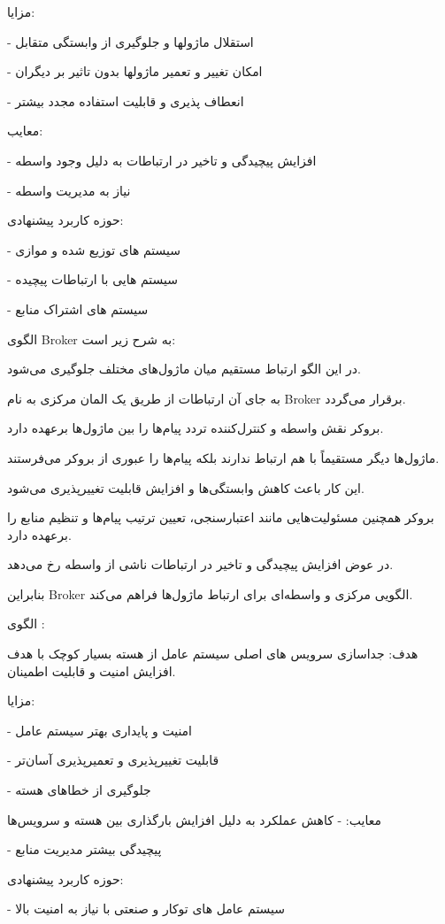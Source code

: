 مزایا:

- استقلال ماژولها و جلوگیری از وابستگی متقابل

- امکان تغییر و تعمیر ماژولها بدون تاثیر بر دیگران

- انعطاف پذیری و قابلیت استفاده مجدد بیشتر

معایب:

- افزایش پیچیدگی و تاخیر در ارتباطات به دلیل وجود واسطه

- نیاز به مدیریت واسطه

حوزه کاربرد پیشنهادی:

- سیستم های توزیع شده و موازی

- سیستم هایی با ارتباطات پیچیده

- سیستم های اشتراک منابع



الگوی Broker به شرح زیر است:

در این الگو ارتباط مستقیم میان ماژول‌های مختلف جلوگیری می‌شود.

به جای آن ارتباطات از طریق یک المان مرکزی به نام Broker برقرار می‌گردد.

بروکر نقش واسطه و کنترل‌کننده تردد پیام‌ها را بین ماژول‌ها برعهده دارد.

ماژول‌ها دیگر مستقیماً با هم ارتباط ندارند بلکه پیام‌ها را عبوری از بروکر می‌فرستند.

این کار باعث کاهش وابستگی‌ها و افزایش قابلیت تغییرپذیری می‌شود.

بروکر همچنین مسئولیت‌هایی مانند اعتبارسنجی، تعیین ترتیب پیام‌ها و تنظیم منابع را برعهده دارد.

در عوض افزایش پیچیدگی و تاخیر در ارتباطات ناشی از واسطه رخ می‌دهد.

بنابراین Broker الگویی مرکزی و واسطه‌ای برای ارتباط ماژول‌ها فراهم می‌کند.

\newpage

الگوی
 :

هدف:  
جداسازی سرویس های اصلی سیستم عامل از هسته بسیار کوچک با هدف افزایش امنیت و قابلیت اطمینان.

مزایا:

- امنیت و پایداری بهتر سیستم عامل

- قابلیت تغییرپذیری و تعمیرپذیری آسان‌تر

- جلوگیری از خطاهای هسته

معایب:
- کاهش عملکرد به دلیل افزایش بارگذاری بین هسته و سرویس‌ها

- پیچیدگی بیشتر مدیریت منابع

حوزه کاربرد پیشنهادی:

- سیستم عامل های توکار و صنعتی با نیاز به امنیت بالا

